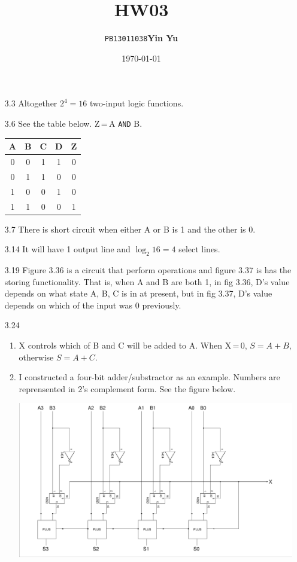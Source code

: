 \documentclass[a4paper]{article}
\title{\textbf{HW03}}
\author{\texttt{PB13011038}\quad\textbf{Yin Yu}}
\date{\today}
\begin{document}
\maketitle

\begin{enumerate}

\item[3.3] Altogether $2^4=16$ two-input logic functions.

\item[3.6] See the table below. Z\,=\,A \verb+AND+ B.
\begin{center}
\begin{tabular}{cc|ccc}
\hline
A & B & C & D & Z \\
\hline
0 & 0 & 1 & 1 & 0 \\
0 & 1 & 1 & 0 & 0 \\
1 & 0 & 0 & 1 & 0 \\
1 & 1 & 0 & 0 & 1 \\
\hline
\end{tabular}
\end{center}

\item[3.7] There is short circuit when either A or B is 1 and the
  other is 0.

\item[3.14] It will have 1 output line and $\log_2{16}=4$ select
  lines.

\item[3.19] Figure 3.36 is a circuit that perform operations and
  figure 3.37 is has the storing functionality. That is, when A and B
  are both 1, in fig 3.36, D's value depends on what state A, B, C is
  in at present, but in fig 3.37, D's value depends on which of the
  input was 0 previously.

\item[3.24]
\begin{enumerate}
\item X controls which of B and C will be added to A. When X\,=\,0,
  $S=A+B$, otherwise $S=A+C$.
\item I constructed a four-bit adder/substractor as an
  example. Numbers are reprensented in 2's complement form. See the
  figure below.
  \begin{center}
  \includegraphics[width=0.5\paperwidth]{a-s.eps}
  \end{center}
\end{enumerate}


\end{enumerate}
\end{document}
